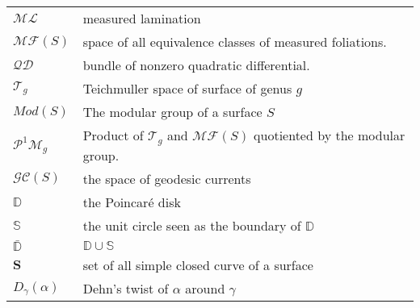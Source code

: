 \begin{tabular}{ll}
  $\mathcal{ML}$ &  measured lamination  \\
  $\mathcal{MF}(S)$ & space of all equivalence classes of measured foliations. \\
  $\mathcal{QD}$ & bundle of nonzero quadratic differential. \\
  $\mathcal{T}_g$ & Teichmuller space of surface of genus $g$ \\
  $Mod(S)$ & The modular group of a surface $S$ \\ 
  $\mathcal{P}^1 \mathcal{M}_g$ & Product of $\mathcal{T}_g$  and $\mathcal{MF}(S)$ quotiented by the modular group. \\
$\mathcal{GC}(S)$  & the space of geodesic currents \\
$\mathbb{D}$ & the Poincaré disk \\
$\mathbb{S}$ & the unit circle seen as the boundary of $\mathbb{D}$ \\
$\bar{\mathbb{D}}$ & $\mathbb{D} \cup \mathbb{S}$\\
$\mathbf{S}$ & set of all simple closed curve of a surface \\
$D_{\gamma}(\alpha)$ & Dehn's twist of $\alpha$ around $\gamma$
\end{tabular}

